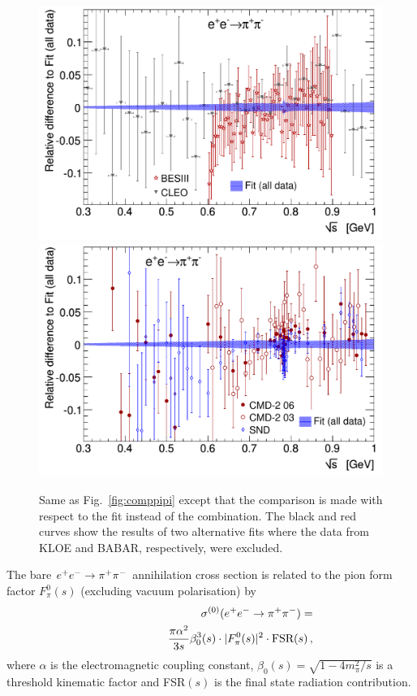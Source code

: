 \begin{figure}[t]
\begin{center}
\includegraphics[width=\figsize]{Figures/ff2_fit_bescleo_dhmz19.pdf}\hspace{\fighspace}
\includegraphics[width=\figsize]{Figures/ff2_fit_sndcmd2_dhmz19.pdf}
\end{center}
\vspace{-0.2cm}
\caption[.]{ 
            Same as Fig.~\ref{fig:comppipi} except that the comparison is made with respect to the fit instead of the combination.
            The black and red curves show the results of two alternative fits where the data from KLOE and BABAR, respectively, were excluded.
}
\label{fig:data-fit}
\end{figure}
The bare $e^+e^-\to\pi^+\pi^-$ annihilation cross section is related to the pion form factor $F^0_\pi(s)$ (excluding vacuum polarisation) by
\begin{eqnarray}
    &&\sigma^{(0)}(e^+e^-\to \pi^+\pi^-)= \nonumber\\
      &&\hspace{1.5cm}\frac{\pi\alpha^2}{3s}\beta^3_0(s)\cdot|F^0_\pi(s)|^2\cdot\textrm{FSR}(s)\,,
\end{eqnarray}
where $\alpha$ is the electromagnetic coupling constant,  $\beta_0(s)=\sqrt{1-4m_\pi^2/s}$ is a threshold kinematic factor and FSR$(s)$ is the final state radiation contribution.

